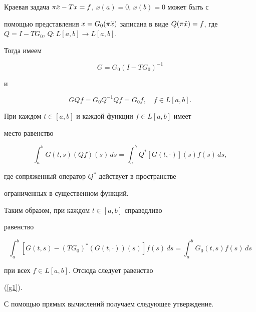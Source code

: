\begin{pf}


Краевая задача $\pi\Ddot x-Tx=f$, $x(a)=0$, $x(b)=0$ может быть с


помощью представления $x=G_0(\pi\Ddot x)$ записана в виде $Q(\pi\Ddot


x)=f$, где $Q=I-TG_0$, $Q:L[a,b]\to L[a,b]$.





Тогда имеем


$$


G=G_0(I-TG_0)^{-1}


$$


и


$$


GQf=G_0Q^{-1}Qf=G_0f,\quad f\in L[a,b].


$$





При каждом $t\in[a,b]$ и каждой функции $f\in L[a,b]$ имеет


место равенство


$$


\int_a^bG(t,s)(Qf)(s)\,ds=\int_a^bQ^*[G(t,\cdot)](s)f(s)\,ds,


$$


где сопряженный оператор $Q^*$ действует в пространстве


ограниченных в существенном функций.








Таким образом, при каждом $t\in[a,b]$ справедливо


равенство


$$


\int_a^b[G(t,s)-(TG_0)^*(G(t,\cdot))(s)]f(s)\,ds


=\int_a^bG_0(t,s)f(s)\,ds


$$


при всех $f\in L[a,b]$. Отсюда следует равенство


(\ref{g1}).


\end{pf}





С помощью прямых вычислений получаем следующее утверждение.





